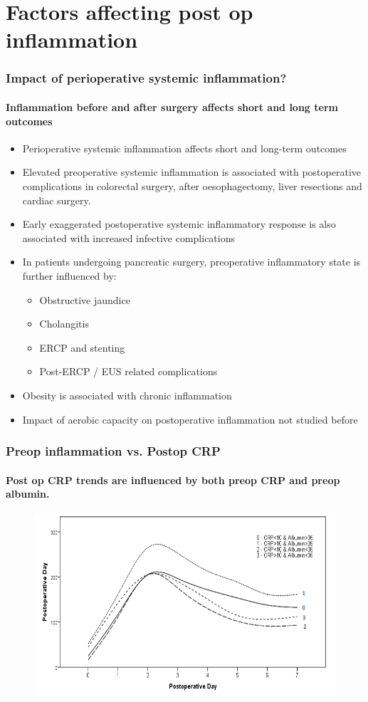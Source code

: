 \documentclass[10pt]{beamer}
\begin{document}
\section[Chapter 5]{Factors affecting post op inflammation}

\begin{frame}
	\frametitle{Impact of perioperative systemic inflammation?}
	\framesubtitle{Inflammation before and after surgery affects short and long term outcomes}
	\begin{itemize}
		\item Perioperative systemic inflammation affects short and long-term outcomes
		\item Elevated preoperative systemic inflammation is associated with postoperative complications in colorectal surgery, after oesophagectomy, liver resections and cardiac surgery. 
		\item Early exaggerated postoperative systemic inflammatory response is also associated with increased infective complications
		\item In patients undergoing pancreatic surgery, preoperative inflammatory state is further influenced by:
		\begin{itemize}
			\item Obstructive jaundice
			\item Cholangitis
			\item ERCP and stenting
			\item Post-ERCP / EUS related complications
		\end{itemize}
		\item Obesity is associated with chronic inflammation
		\item Impact of aerobic capacity on postoperative inflammation not studied before
	\end{itemize}
\end{frame}

\begin{frame}
	\frametitle{Preop inflammation vs. Postop CRP}
	\framesubtitle{Post op CRP trends are influenced by both preop CRP and preop albumin.}
	\begin{figure}
		\includegraphics[width=\textwidth]{../Figures/sirs_crp_crp_alb}
	\end{figure}
\end{frame}
\end{document}
